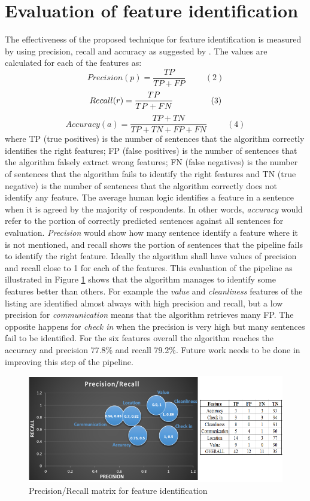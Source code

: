 \section{Evaluation of feature identification}
The effectiveness of the proposed technique for feature identification is measured by using precision, recall and accuracy as suggested by \cite{huang2006performance}. The values are calculated for each of the features as:
$$ Precision  (p) =\frac{TP}{TP+FP}\hspace{1cm}(2)$$
$$ Recall  (r) = \frac{TP}{TP + FN}\hspace{1.6cm}(3) $$
$$ Accuracy (a) = \frac{TP + TN}{TP+TN+FP+FN} \hspace{1cm}(4)$$
where TP (true positives) is the number of sentences that the algorithm correctly identifies the right features;
 FP (false positives) is the number of sentences that the algorithm falsely extract wrong features; FN (false negatives) is the number of sentences that the algorithm fails to identify the right features and TN (true negative) is the number of sentences that the algorithm correctly does not identify any feature. The average human logic identifies a feature in a sentence when it is agreed by the majority of respondents. In other words, \textit{accuracy} would refer to the portion of correctly predicted sentences against all sentences for evaluation.  \textit{Precision} would show how many sentence identify a feature where it is not mentioned, and recall shows the portion of sentences that the pipeline fails to identify the right feature. Ideally the algorithm shall have values of precision and recall close to 1 for each of the features. This evaluation of the pipeline as illustrated in Figure \ref{fig:matrix} shows that the algorithm manages to identify some features better than others. For example the \textit{value} and \textit{cleanliness} features of the listing are identified almost always with high precision and recall, but a low precision for \textit{communication} means that the algorithm retrieves many FP. The opposite happens for \textit{check in} when the precision is very high but many sentences fail to be identified. For the six features overall the algorithm reaches the accuracy and precision 77.8\% and recall 79.2\%. Future work needs to be done in improving this step of the pipeline.
\begin{figure}[h!]
	\centering
	\includegraphics[height=0.3\textheight]{PR_table}
	\caption{Precision/Recall matrix for feature identification}
	\label{fig:matrix}
\end{figure}